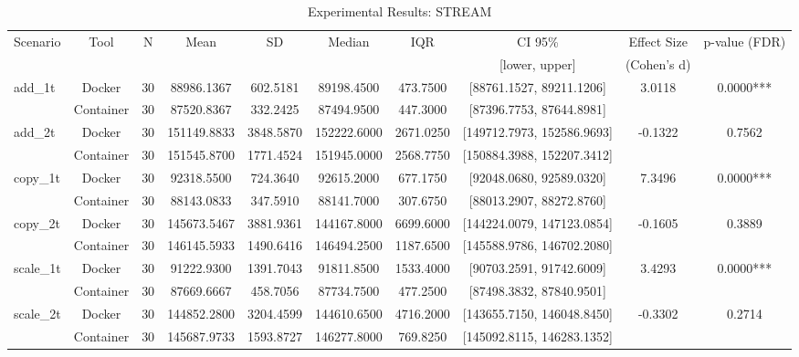 \documentclass{article}
\begin{document}

\begin{table}[h]
\centering
\small
\caption{Experimental Results: STREAM}
\label{tab:stream}
\begin{tabular}{lccccccccc}
\toprule
Scenario & Tool & N & Mean & SD & Median & IQR & CI 95\% & Effect Size & p-value (FDR) \\
 & & & & & & & [lower, upper] & (Cohen's d) & \\
\midrule
\multirow{2}{*}{add\_1t} & Docker & 30 & 88986.1367 & 602.5181 & 89198.4500 & 473.7500 & [88761.1527, 89211.1206] & 3.0118 & 0.0000*** \\
 & Container & 30 & 87520.8367 & 332.2425 & 87494.9500 & 447.3000 & [87396.7753, 87644.8981] &  &  \\
\midrule
\multirow{2}{*}{add\_2t} & Docker & 30 & 151149.8833 & 3848.5870 & 152222.6000 & 2671.0250 & [149712.7973, 152586.9693] & -0.1322 & 0.7562 \\
 & Container & 30 & 151545.8700 & 1771.4524 & 151945.0000 & 2568.7750 & [150884.3988, 152207.3412] &  &  \\
\midrule
\multirow{2}{*}{copy\_1t} & Docker & 30 & 92318.5500 & 724.3640 & 92615.2000 & 677.1750 & [92048.0680, 92589.0320] & 7.3496 & 0.0000*** \\
 & Container & 30 & 88143.0833 & 347.5910 & 88141.7000 & 307.6750 & [88013.2907, 88272.8760] &  &  \\
\midrule
\multirow{2}{*}{copy\_2t} & Docker & 30 & 145673.5467 & 3881.9361 & 144167.8000 & 6699.6000 & [144224.0079, 147123.0854] & -0.1605 & 0.3889 \\
 & Container & 30 & 146145.5933 & 1490.6416 & 146494.2500 & 1187.6500 & [145588.9786, 146702.2080] &  &  \\
\midrule
\multirow{2}{*}{scale\_1t} & Docker & 30 & 91222.9300 & 1391.7043 & 91811.8500 & 1533.4000 & [90703.2591, 91742.6009] & 3.4293 & 0.0000*** \\
 & Container & 30 & 87669.6667 & 458.7056 & 87734.7500 & 477.2500 & [87498.3832, 87840.9501] &  &  \\
\midrule
\multirow{2}{*}{scale\_2t} & Docker & 30 & 144852.2800 & 3204.4599 & 144610.6500 & 4716.2000 & [143655.7150, 146048.8450] & -0.3302 & 0.2714 \\
 & Container & 30 & 145687.9733 & 1593.8727 & 146277.8000 & 769.8250 & [145092.8115, 146283.1352] &  &  \\
\midrule

\end{tabular}
\end{table}
\end{document}
